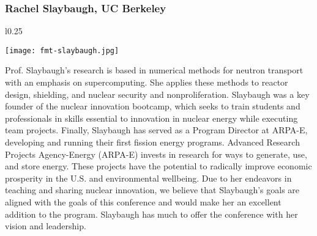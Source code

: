 \subsubsection{Rachel Slaybaugh, UC Berkeley}
\setlength\intextsep{0pt}
\begin{wrapfigure}{l}{0.25\textwidth}
	\begin{center}
		\texttt{[image: fmt-slaybaugh.jpg]}
	\end{center}
\end{wrapfigure}
Prof. Slaybaugh's research is based in numerical methods for neutron transport with an emphasis on supercomputing. She applies these methods to reactor design, shielding, and nuclear security and nonproliferation. Slaybaugh was a key founder of the nuclear innovation bootcamp, which seeks to train students and professionals in skills essential to innovation in nuclear energy while executing team projects. Finally, Slaybaugh has served as a Program Director at ARPA-E, developing and running their first fission energy programs. Advanced Research Projects Agency-Energy (ARPA-E) invests in research for ways to generate, use, and store energy. These projects have the potential to radically improve economic prosperity in the U.S. and environmental wellbeing. Due to her endeavors in teaching and sharing nuclear innovation, we believe that Slaybaugh's goals are aligned with the goals of this conference and would make her an excellent addition to the program. Slaybaugh has much to offer the conference with her vision and leadership.\\



